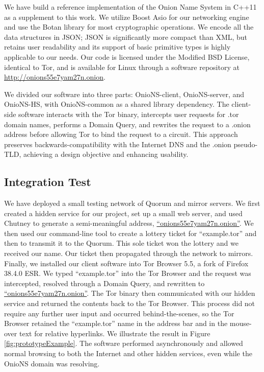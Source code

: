 \documentclass[USenglish,oneside,twocolumn]{article}
\begin{document}
We have build a reference implementation of the Onion Name System in C++11 as a supplement to this work. We utilize Boost Asio \cite{AsioLib} for our networking engine and use the Botan \cite{BotanLib} library for most cryptographic operations. We encode all the data structures in JSON; JSON is significantly more compact than XML, but retains user readability and its support of basic primitive types is highly applicable to our needs. Our code is licensed under the Modified BSD License, identical to Tor, and is available for Linux through a software repository at \href{http://onions55e7yam27n.onion}{http://onions55e7yam27n.onion}.

We divided our software into three parts: OnioNS-client, OnioNS-server, and OnioNS-HS, with OnioNS-common as a shared library dependency. The client-side software interacts with the Tor binary, intercepts user requests for .tor domain names, performs a Domain Query, and rewrites the request to a .onion address before allowing Tor to bind the request to a circuit. This approach preserves backwards-compatibility with the Internet DNS and the .onion pseudo-TLD, achieving a design objective and enhancing usability.


\subsection{Integration Test} %

We have deployed a small testing network of Quorum and mirror servers. We first created a hidden service for our project, set up a small web server, and used Chutney to generate a semi-meaningful address, \href{http://onions55e7yam27n.onion}{``onions55e7yam27n.onion''}. We then used our command-line tool to create a lottery ticket for ``example.tor'' and then to transmit it to the Quorum. This sole ticket won the lottery and we received our name. Our ticket then propagated through the network to mirrors. Finally, we installed our client software into Tor Browser 5.5, a fork of Firefox 38.4.0 ESR. We typed ``example.tor'' into the Tor Browser and the request was intercepted, resolved through a Domain Query, and rewritten to \href{http://onions55e7yam27n.onion}{``onions55e7yam27n.onion''}. The Tor binary then communicated with our hidden service and returned the contents back to the Tor Browser. This process did not require any further user input and occurred behind-the-scenes, so the Tor Browser retained the ``example.tor'' name in the address bar and in the mouse-over text for relative hyperlinks. We illustrate the result in Figure \ref{fig:prototypeExample}. The software performed asynchronously and allowed normal browsing to both the Internet and other hidden services, even while the OnioNS domain was resolving.
\end{document}
